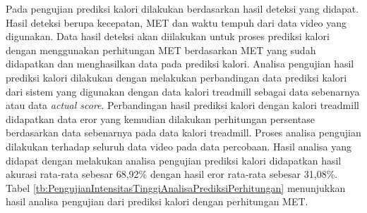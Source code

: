Pada pengujian prediksi kalori dilakukan berdasarkan hasil deteksi yang didapat. Hasil deteksi berupa kecepatan, MET dan waktu tempuh dari data video yang digunakan. Data hasil deteksi akan diilakukan untuk proses prediksi kalori dengan menggunakan perhitungan MET berdasarkan MET yang sudah didapatkan dan menghasilkan data pada prediksi kalori. Analisa pengujian hasil prediksi kalori dilakukan dengan melakukan perbandingan data prediksi kalori dari sistem yang digunakan dengan data kalori treadmill sebagai data sebenarnya atau data \emph{actual score}. Perbandingan hasil prediksi kalori dengan kalori treadmill didapatkan data eror yang kemudian dilakukan perhitungan persentase berdasarkan data sebenarnya pada data kalori treadmill. Proses analisa pengujian dilakukan terhadap seluruh data video pada data percobaan. Hasil analisa yang didapat dengan melakukan analisa pengujian prediksi kalori didapatkan hasil akurasi rata-rata sebesar 68,92\% dengan hasil eror rata-rata sebesar 31,08\%. Tabel \ref{tb:PengujianIntensitasTinggiAnalisaPrediksiPerhitungan} menunjukkan hasil analisa pengujian dari prediksi kalori dengan perhitungan MET.

